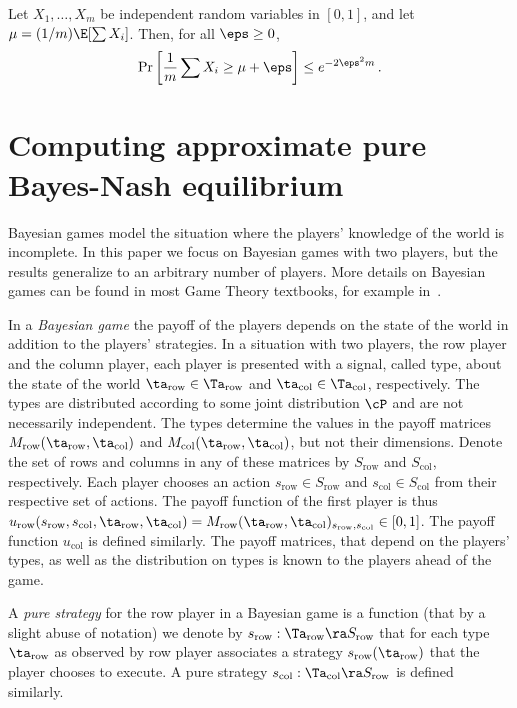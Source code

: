 \begin{lemma}
  \label{lemma:chernoff}
  Let $X_1, \ldots, X_m$ be independent random variables in $[0,1]$, and let
  $\mu = ({1}/{m}) \E[ \sum X_i]$.  Then, for all $\eps \ge 0$,
  $$
  \Pr\left[ \frac{1}{m} \sum X_i \ge \mu + \eps \right] \le e^{-2\eps^2 m}\,.
  $$
\end{lemma}

\section{Computing approximate pure Bayes-Nash equilibrium}
\label{sec:bayes}

Bayesian games model the situation where the players' knowledge of the
world is incomplete.  In this paper we focus on Bayesian games
with two players, but the results generalize to an arbitrary number of
players. More details on Bayesian games can be found in most Game
Theory textbooks, for example in~\cite{FudenbergTirole}.

In a \emph{Bayesian game} the payoff of the players depends on the
state of the world in addition to the players' strategies. In a
situation with two players, the row player and the column player, each player is presented with
a signal, called type, about the state of the world $\ta_{\mathrm{row}}\in \Ta_{\mathrm{row}}$
and $\ta_\mathrm{col}\in\Ta_\mathrm{col}$, respectively.  The types are distributed
according to some joint distribution $\cP$ and are not necessarily
independent. The types determine the values in the payoff matrices $M_{\mathrm{row}}(\ta_{\mathrm{row}},\ta_\mathrm{col})$ and $M_\mathrm{col}(\ta_{\mathrm{row}},\ta_\mathrm{col})$, but not their dimensions. Denote 
the set of rows and columns in any of these matrices by $S_{\mathrm{row}}$ and $S_\mathrm{col}$, respectively.
 Each player chooses an action $s_{\mathrm{row}}\in S_{\mathrm{row}}$ and $s_\mathrm{col}\in
S_\mathrm{col}$ from their respective set of actions.
The payoff function of the first player is thus $u_{\mathrm{row}}(s_{\mathrm{row}},s_\mathrm{col},\ta_{\mathrm{row}},\ta_\mathrm{col})=M_{\mathrm{row}}(\ta_{\mathrm{row}},\ta_\mathrm{col})_{s_{\mathrm{row}},s_\mathrm{col}}\in
[0,1]$. The payoff function $u_\mathrm{col}$ is defined similarly.
The payoff matrices, that depend on the players' types, as well as the distribution on types is known to the players
ahead of the game. 

A \emph{pure strategy} for the row player  in a Bayesian game is a function (that by a slight abuse of notation) we denote 
by $s_{\mathrm{row}}:\Ta_{\mathrm{row}}\ra S_{\mathrm{row}}$ that for each type $\ta_{\mathrm{row}}$ as observed by row player associates a strategy $s_{\mathrm{row}}(\ta_{\mathrm{row}})$
that the player chooses to execute. A pure strategy $s_\mathrm{col}:\Ta_\mathrm{col}\ra S_{\mathrm{row}}$ is defined similarly. 

